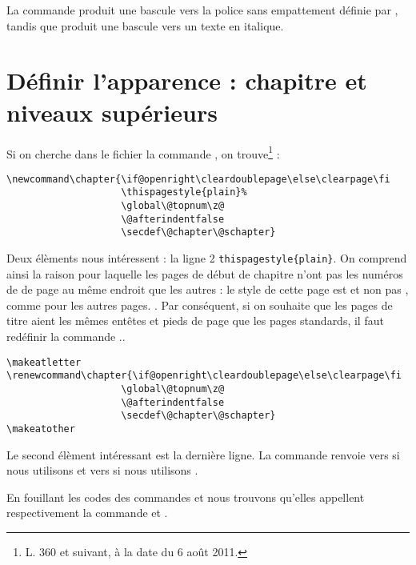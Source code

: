 La commande  produit une bascule vers la police sans empattement définie par , tandis que  produit une bascule vers un texte en italique.

\section{Définir l'apparence : chapitre et niveaux supérieurs}

Si on cherche dans le fichier  la commande , on trouve\footnote{L. 360 et suivant, à la date du 6 août 2011.} :

\begin{verbatim}
\newcommand\chapter{\if@openright\cleardoublepage\else\clearpage\fi
                    \thispagestyle{plain}%
                    \global\@topnum\z@
                    \@afterindentfalse
                    \secdef\@chapter\@schapter}
\end{verbatim}

Deux élèments nous intéressent : la ligne 2 \verb|thispagestyle{plain}|. On comprend ainsi la raison pour laquelle les  pages de début de chapitre n'ont pas les numéros de de page au même endroit que les autres : le style de cette page est  et non pas , comme pour les autres pages. . Par conséquent, si on souhaite que les pages de titre aient les mêmes entêtes et pieds de page que les pages standards, il faut redéfinir la commande .\label{entetechapter}.\label{chapitrepagestyle}

\begin{verbatim}
\makeatletter
\renewcommand\chapter{\if@openright\cleardoublepage\else\clearpage\fi
                    \global\@topnum\z@
                    \@afterindentfalse
                    \secdef\@chapter\@schapter}
\makeatother
\end{verbatim}

Le second élèment intéressant est la dernière ligne. La commande  renvoie vers  si nous utilisons  et vers  si nous utilisons .

En fouillant les codes des commandes  et  nous trouvons qu'elles appellent respectivement la commande  et .

